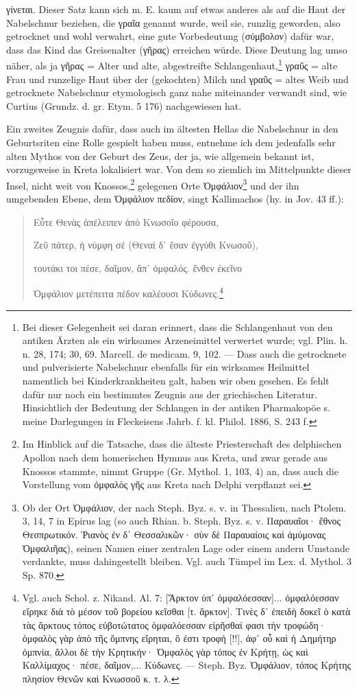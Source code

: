\documentclass[a4paper, 11pt, oneside]{article}
\begin{document}
γίνεται. Dieser Satz kann sich m. E. kaum auf etwas anderes als auf die Haut der Nabelschnur beziehen, die γραῖα genannt wurde, weil sie, runzlig geworden, also getrocknet und wohl verwahrt, eine gute Vorbedeutung (σύμβολον) dafür war, dass das Kind das Greisenalter (γῆρας) erreichen würde. Diese Deutung lag umso näher, als ja γῆρας = Alter und alte, abgestreifte Schlangenhaut,\footnote{Bei dieser Gelegenheit sei daran erinnert, dass die Schlangenhaut von den antiken Ärzten als ein wirksames Arzeneimittel verwertet wurde; vgl. Plin. h. n. 28, 174; 30, 69. Marcell. de medicam. 9, 102. --- Dass auch die getrocknete und pulverisierte Nabelschnur ebenfalls für ein wirksames Heilmittel namentlich bei Kinderkrankheiten galt, haben wir oben gesehen. Es fehlt dafür nur noch ein bestimmtes Zeugnis aus der griechischen Literatur. Hinsichtlich der Bedeutung der Schlangen in der antiken Pharmakopöe s. meine Darlegungen in Fleckeisens Jahrb. f. kl. Philol. 1886, S. 243 f.} γραῦς = alte Frau und runzelige Haut über der (gekochten) Milch und γραῦς = altes Weib und getrocknete Nabelschnur etymologisch ganz nahe miteinander verwandt sind, wie Curtius (Grundz. d. gr. Etym. 5 176) nachgewiesen hat.

Ein zweites Zeugnis dafür, dass auch im ältesten Hellas die Nabelschnur in den Geburtsriten eine Rolle gespielt haben muss, entnehme ich dem jedenfalls sehr alten Mythos von der Geburt des Zeus, der ja, wie allgemein bekannt ist, vorzugsweise in Kreta lokalisiert war. Von dem so ziemlich im Mittelpunkte dieser Insel, nicht weit von Knossos,\footnote{Im Hinblick auf die Tatsache, dass die älteste Priesterschaft des delphischen Apollon nach dem homerischen Hymnus aus Kreta, und zwar gerade aus Knossos stammte, nimmt Gruppe (Gr. Mythol. 1, 103, 4) an, dass auch die Vorstellung vom ὀμφαλὸς γῆς aus Kreta nach Delphi verpflanzt sei.} gelegenen Orte Ὀμφάλιον\footnote{Ob der Ort Ὀμφάλιον, der nach Steph. Byz. s. v. in Thessalien, nach Ptolem. 3, 14, 7 in Epirus lag (so auch Rhian. b. Steph. Byz. s. v. Παραυαῖοι· ἔθνος Θεσπρωτικόν. Ῥιανὸς ἐν δ΄ Θεσσαλικῶν· σὺν δὲ Παραυαίοις καὶ ἀμύμονας Ὀμφαλιῆας), seinen Namen einer zentralen Lage oder einem andern Umstande verdankte, muss dahingestellt bleiben. Vgl. auch Tümpel im Lex. d. Mythol. 3 Sp. 870.} und der ihn umgebenden Ebene, dem Ὀμφάλιον πεδίον, singt Kallimachos (hy. in Jov. 43 ff.):
\begin{quotation}
Εὗτε Θενὰς ἀπέλειπεν ἀπὸ Κνωσοῖο φέρουσα,

Ζεῦ πάτερ, ἡ νύμφη σέ (Θεναὶ δ᾽ ἔσαν ἐγγύθι Κνωσοῦ),

τουτάκι τοι πέσε, δαῖμον, ἄπ᾽ ὀμφαλός. ἔνθεν ἐκεῖνο

Ὀμφάλιον μετέπειτα πέδον καλέουσι Κύδωνες.\footnote{Vgl. auch Schol. z. Nikand. Al. 7: [Ἄρκτον ὑπ᾽ ὀμφαλόεσσαν]... ὀμφαλόεσσαν εἴρηκε διὰ τὸ μέσον τοῦ βορείου κεῖσθαι [τ. ἄρκτον]. Τινὲς δ᾽ ἐπειδὴ δοκεῖ ὁ κατὰ τὰς ἄρκτους τόπος εὐβοτώτατος ὀμφαλόεσσαν εἰρῆσθαί φασι τὴν τροφώδη· ὀμφαλὸς γὰρ ἀπὸ τῆς ὄμπνης εἴρηται, ὅ ἐστι τροφή [!!], ἀφ᾽ οὗ καὶ ἡ Δημήτηρ ὀμπνία, ἄλλοι δὲ τὴν Κρητικήν· Ὀμφαλὸς γὰρ τόπος ἐν Κρήτῃ, ὡς καὶ Καλλίμαχος· πέσε, δαῖμον,... Κύδωνες. --- Steph. Byz. Ὀμφάλιον, τόπος Κρήτης πλησίον Θενῶν καὶ Κνωσσοῦ κ. τ. λ.}
\end{quotation}
\end{document}
